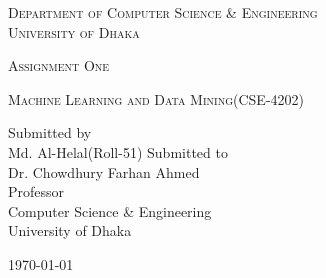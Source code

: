 \documentclass[a4paper,12pt]{article}
\begin{document}
\begin{titlepage}
\centering
{\scshape\LARGE Department of Computer Science \& Engineering\\University of Dhaka \par}
\vspace{1.5cm}
{\scshape\Large Assignment One\par}
{\scshape\Large Machine Learning and Data Mining(CSE-4202)\par}
\vspace{2cm}
{\Large Submitted by\\
\vspace{0.5cm}
 \centering Md. Al-Helal(Roll-51)}
\vfill
{\Large Submitted to\\
\vspace{0.5cm}
 Dr. Chowdhury Farhan Ahmed\\ Professor\\Computer Science \& Engineering\\University of Dhaka}
\vfill
{\large \today\par}
\end{titlepage}
\end{document}
